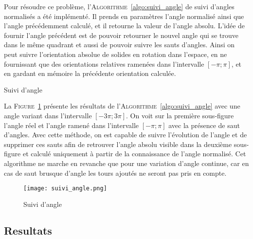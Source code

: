     Pour résoudre ce problème, l'\textsc{Algorithme}~\ref{algo:suivi_angle} de suivi d'angles normalisés a été implémenté. Il prends en paramètres l'angle normalisé ainsi que l'angle précédemment calculé, et il retourne la valeur de l'angle absolu. L'idée de fournir l'angle précédent est de pouvoir retourner le nouvel angle qui se trouve dans le même quadrant et aussi de pouvoir suivre les sauts d'angles. Ainsi on peut suivre l'orientation absolue de solides en rotation dans l'espace, en ne fournissant que des orientations relatives ramenées dans l'intervalle $[-\pi; \pi]$, et en gardant en mémoire la précédente orientation calculée.
    
    \begin{algorithm}[!htb]

        \caption{Suivi d'angle} 
        \label{algo:suivi_angle}
    \end{algorithm}

    La \textsc{Figure}~\ref{fig:suivi_angle} présente les résultats de l'\textsc{Algorithme}~\ref{algo:suivi_angle} avec une angle variant dans l'intervalle $[-3\pi; 3\pi]$. On voit sur la première sous-figure l'angle réel et l'angle ramené dans l'intervalle $[-\pi; \pi]$ avec la présence de saut d'angles. Avec cette méthode, on est capable de suivre l'évolution de l'angle et de supprimer ces sauts afin de retrouver l'angle absolu visible dans la deuxième sous-figure et calculé uniquement à partir de la connaissance de l'angle normalisé. Cet algorithme ne marche en revanche que pour une variation d'angle continue, car en cas de saut brusque d'angle les tours ajoutés ne seront pas pris en compte.

    \begin{figure}[!htb]
        \centering
        \texttt{[image: suivi\_angle.png]}
        \caption{Suivi d'angle}
        \label{fig:suivi_angle}
    \end{figure}


\subsection{Resultats}